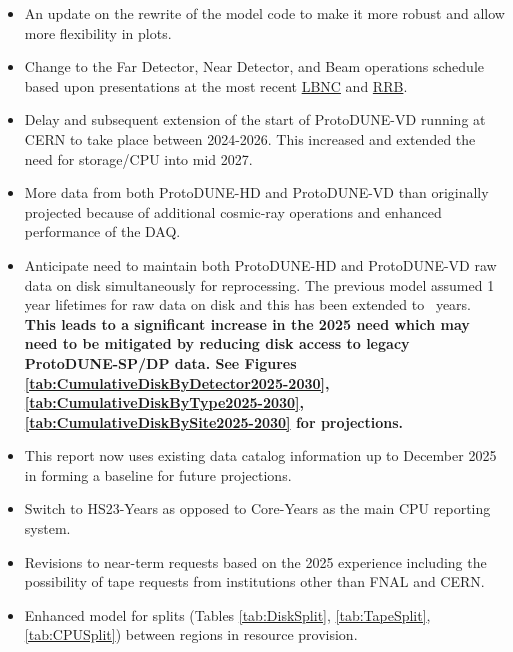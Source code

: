 \documentclass[12pt]{article}
\begin{document}
\begin{itemize}
\item An update on the rewrite of the model code to make it more robust and allow more flexibility in plots. 
\item Change to the Far Detector, Near Detector, and Beam operations schedule based upon presentations at the most recent \href{https://indico.fnal.gov/event/70787/}{LBNC} and \href{https://indico.fnal.gov/event/71286/}{RRB}.
\item Delay and subsequent extension of the start of ProtoDUNE-VD running at CERN to take place between 2024-2026. This increased and extended the need for storage/CPU into mid 2027.  
\item More data from both ProtoDUNE-HD and ProtoDUNE-VD than originally projected because of additional cosmic-ray operations and enhanced performance of the DAQ.
\item Anticipate need to maintain both ProtoDUNE-HD and ProtoDUNE-VD raw data on disk simultaneously  for reprocessing.  The previous model assumed 1 year lifetimes for raw data on disk and this has been extended to \configRawDataDiskLifetimes\ years.  {\bf This leads to a significant increase in the 2025 need which may need to be mitigated by reducing disk access to legacy ProtoDUNE-SP/DP data.
See Figures  \ref{tab:CumulativeDiskByDetector2025-2030}, \ref{tab:CumulativeDiskByType2025-2030}, \ref{tab:CumulativeDiskBySite2025-2030} for projections.  }
\item This report now uses existing data catalog information up to December 2025 in forming a baseline for future projections. 
\item Switch to HS23-Years as opposed to Core-Years as the main CPU reporting system.
\item Revisions to near-term requests based on the 2025 experience including the possibility of tape requests from institutions other than FNAL and CERN.
\item Enhanced model for splits (Tables \ref{tab:DiskSplit}, \ref{tab:TapeSplit}, \ref{tab:CPUSplit}) between regions in resource provision. 
\end{itemize}
\end{document}
